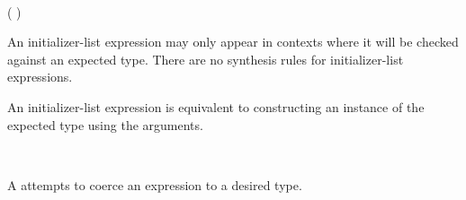 %
%


\begin{Syntax}
	 \\
		\code{\{} ( \code{,})\SynStar \code{\}}
\end{Syntax}

\begin{Description}
An initializer-list expression may only appear in contexts where it will be checked against an expected type.
There are no synthesis rules for initializer-list expressions.

An initializer-list expression is equivalent to constructing an instance of the expected type using the arguments.
\end{Description}

\begin{Checking}
\end{Checking}


\begin{Syntax}
	 \\
		\code{(}  \code{)} 
\end{Syntax}

\begin{Description}
A  attempts to coerce an expression to a desired type.
\end{Description}

\begin{Checking}
\end{Checking}

